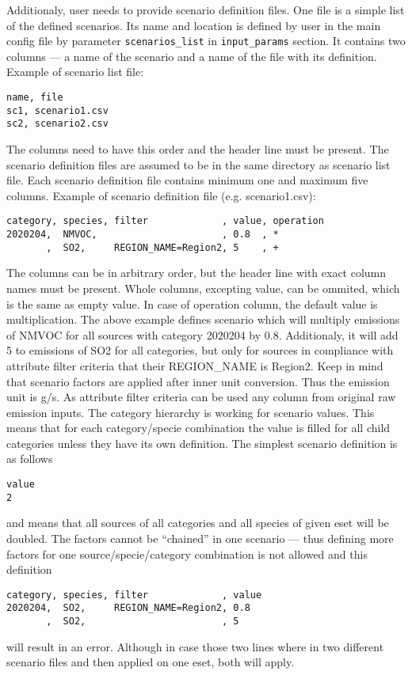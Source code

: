 \documentclass[a4paper,11pt]{article}
\begin{document}
Additionaly, user needs to provide scenario definition files. One file is a simple list of the defined scenarios. Its name and location is defined by user in the main config file by parameter \verb|scenarios_list| in \verb|input_params| section. It contains two columns --- a name of the scenario and a name of the file with its definition. Example of scenario list file:
\begin{verbatim}
name, file
sc1, scenario1.csv
sc2, scenario2.csv
\end{verbatim}
The columns need to have this order and the header line must be present. The scenario definition files are assumed to be in the same directory as scenario list file. Each scenario definition file contains minimum one and maximum five columns. Example of scenario definition file (e.g. scenario1.csv):
\begin{verbatim}
category, species, filter             , value, operation
2020204,  NMVOC,                      , 0.8  , *
       ,  SO2,     REGION_NAME=Region2, 5    , +
\end{verbatim}
The columns can be in arbitrary order, but the header line with exact column names must be present. Whole columns, excepting value, can be ommited, which is the same as empty value. In case of operation column, the default value is multiplication. The above example defines scenario which will multiply emissions of NMVOC for all sources with category 2020204 by 0.8. Additionaly, it will add 5 to emissions of SO2 for all categories, but only for sources in compliance with attribute filter criteria that their REGION\_NAME is Region2. Keep in mind that scenario factors are applied after inner unit conversion. Thus the emission unit is g/s. As attribute filter criteria can be used any column from original raw emission inputs. The category hierarchy is working for scenario values. This means that for each category/specie combination the value is filled for all child categories unless they have its own definition. The simplest scenario definition is as follows
\begin{verbatim}
value
2
\end{verbatim}
and means that all sources of all categories and all species of given eset will be doubled. The factors cannot be ``chained'' in one scenario --- thus defining more factors for one source/specie/category combination is not allowed and this definition
\begin{verbatim}
category, species, filter             , value
2020204,  SO2,     REGION_NAME=Region2, 0.8
       ,  SO2,                        , 5
\end{verbatim}
will result in an error. Although in case those two lines where in two different scenario files and then applied on one eset, both will apply.
\end{document}
